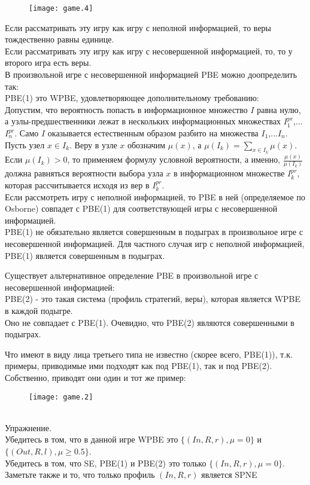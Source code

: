 \documentclass[pdftex,12pt,a4paper]{article}
\begin{document}
\begin{figure}[h]
  \texttt{[image: game.4]}
\end{figure}

Если рассматривать эту игру как игру с неполной информацией, то
веры тождественно равны единице. \\
Если рассматривать эту игру как игру с несовершенной информацией,
то, то у второго игра есть веры. \\






В произвольной игре с несовершенной информацией PBE можно
доопределить так: \\
PBE(1) это WPBE, удовлетворяющее дополнительному требованию: \\

Допустим, что вероятность попасть в информационное множество $I$
равна нулю, а узлы-предшественники лежат в нескольких
информационных множествах $I_{1}^{pr}$,...$I_{n}^{pr}$. Само $I$
оказывается естественным образом разбито на множества
$I_{1}$,...$I_{n}$. Пусть узел $x \in I_{k}$. Веру в узле $x$
обозначим $\mu(x)$, а $\mu(I_{k})=\sum_{x \in I_{k}} \mu(x)$. Если
$\mu(I_{k})>0$, то применяем формулу условной вероятности, а
именно, $ \frac{\mu(x)}{\mu(I_{k})}$ должна равняться вероятности
выбора узла $x$ в информационном множестве $I_{k}^{pr}$, которая
рассчитывается исходя из вер в $I_{k}^{pr}$. \\

Если рассмотреть игру с неполной информацией, то PBE в ней
(определяемое по Osborne) совпадет с PBE(1) для
соответствующей игры с несовершенной информацией. \\

PBE(1) не обязательно является совершенным в подыграх в
произвольное игре с несовершенной информацией. Для частного случая
игр с неполной информацией, PBE(1) является совершенным в
подыграх.

Существует альтернативное определение PBE в произвольной игре с
несовершенной информацией: \\
PBE(2) - это такая система (профиль стратегий, веры), которая
является WPBE  в каждой подыгре. \\

Оно не совпадает с PBE(1). Очевидно, что PBE(2) являются
совершенными в подыграх.

Что имеют в виду лица третьего типа не известно  (скорее всего,
PBE(1)), т.к. примеры, приводимые ими подходят как под PBE(1), так
и под PBE(2).
Собственно, приводят они один и тот же пример: \\
\begin{figure}[h]
  \texttt{[image: game.2]}
\end{figure}
\\
Упражнение. \\
Убедитесь в том, что в данной игре WPBE это $\{(In,R,r),\mu=0\}$ и
$\{(Out,R,l),\mu \geq 0.5\}$. \\
Убедитесь в том, что SE, PBE(1) и PBE(2) это только $\{(In,R,r),\mu=0\}$. \\
Заметьте также и то, что только профиль $(In,R,r)$ является SPNE \\
\end{document}
